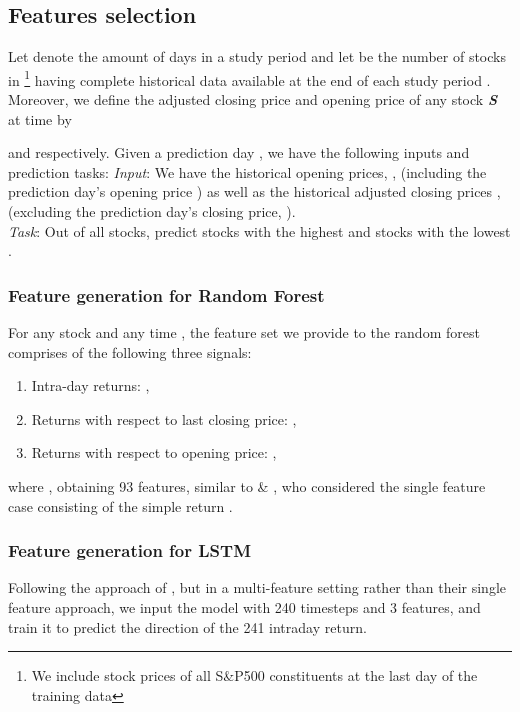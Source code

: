 \documentclass[review]{elsarticle}
\begin{document}
\subsection{Features selection}
\label{subsec:features}
Let  denote the amount of days in a study period
and let  be the number of stocks  in \footnote{We include stock prices of all S\&P500 constituents at the last day of the training data} having complete historical data available at the end of each study period . Moreover, we define the adjusted closing price and opening price of any stock \textbf{\textit{S}} at time   by 

and
 respectively.
\newline
Given a prediction day , we have the following inputs and prediction tasks: \newline
\textit{Input}: We have the historical opening prices,  , (including the prediction day's opening price ) 
as well as
the historical adjusted closing prices , (excluding the prediction day's closing price, ).
\\
\textit{Task}: Out of all  stocks, predict  stocks with the highest and  stocks with the lowest .



\subsubsection{Feature  generation for Random Forest}\label{subsubsec:feature-RF}
For any stock  and any time , the 
feature set we provide  to the random forest comprises of the following three signals:
\begin{enumerate}\item Intra-day returns: ,
    \item Returns with respect to last closing price: ,
    \item Returns with respect to opening price: ,
\end{enumerate}
where , obtaining 93 features, similar to \cite{takeuchi2013} \& \cite{krauss17}, who  considered the single feature case consisting of the simple return
.


\subsubsection{Feature  generation for LSTM} Following the approach of \cite{krauss18}, but in a multi-feature setting rather than their single feature approach, we  
input the model with 240 timesteps and 3 features, and train it to predict the direction of the 241 intraday return. 
\end{document}
